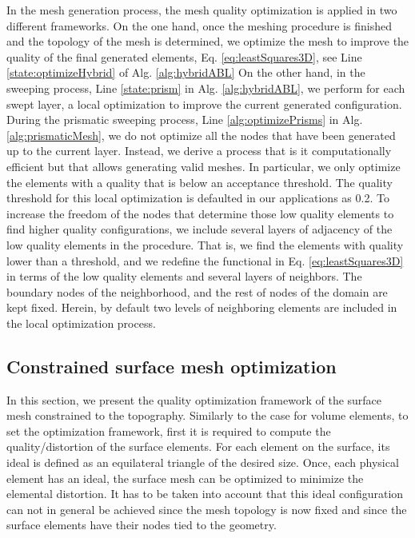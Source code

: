 \documentclass[1p]{elsarticle}
\begin{document}
In the mesh generation process, the mesh quality optimization is applied in two different frameworks. 
On the one hand, once the meshing procedure is finished and the topology of the mesh is determined, we 
optimize the mesh to improve the quality of the final generated elements, Eq. \eqref{eq:leastSquares3D}, see  Line \ref{state:optimizeHybrid} of Alg. \ref{alg:hybridABL}
On the other hand, in the sweeping process, Line \ref{state:prism} in Alg. \ref{alg:hybridABL}, we perform for each swept layer, a local optimization to improve the current generated configuration.
During the prismatic sweeping process, Line \ref{alg:optimizePrisms} in Alg. \ref{alg:prismaticMesh},  
we do not optimize all the nodes that have been generated up to the current layer.
Instead, we derive a process that is it computationally efficient but that allows generating valid meshes. 
In particular, we only optimize the elements 
with a quality that is below an acceptance threshold.
The quality threshold for this local optimization is defaulted in our applications as 0.2.
To increase the freedom of the nodes that determine those low quality elements to find higher quality configurations, we include several layers of adjacency of the low quality elements in the procedure.
That is, we  find the elements with quality lower than a threshold, and we redefine the functional in Eq. \eqref{eq:leastSquares3D} in terms of the low quality elements and several layers of neighbors.
The boundary nodes of the neighborhood, and the rest of nodes of the domain are kept fixed.
Herein, by default two levels of neighboring elements are included in the local optimization process.



\subsection{Constrained surface mesh optimization}
\label{sec:optimizationSurface}

In this section, we present the quality optimization framework of the surface mesh constrained to the topography.
Similarly to the case for volume elements, to set the optimization framework, first it is required to compute the quality/distortion of the surface elements.
For each element on the surface, its ideal is defined as an equilateral triangle of the desired size. 
Once, each physical element has an ideal, the surface mesh can be optimized to minimize the elemental distortion.
It has to be taken into account that this ideal configuration can not in general be achieved since the mesh topology is now fixed and since the surface elements have their nodes tied to the geometry.
\end{document}
